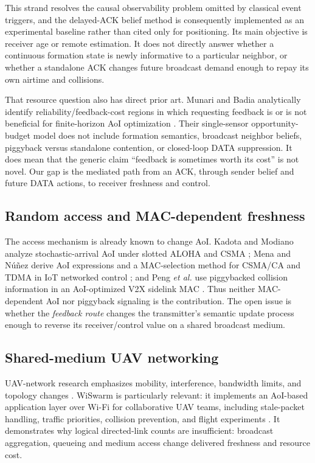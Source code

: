 This strand resolves the causal observability problem omitted by classical
event triggers, and the delayed-ACK belief method is consequently implemented
as an experimental baseline rather than cited only for positioning. Its main
objective is receiver age or remote estimation. It does not directly answer
whether a continuous formation state is newly informative to a particular
neighbor, or whether a standalone ACK changes future broadcast demand enough
to repay its own airtime and collisions.

That resource question also has direct prior art. Munari and Badia
analytically identify reliability/feedback-cost regions in which requesting
feedback is or is not beneficial for finite-horizon AoI optimization
\cite{munari2025feedback}. Their single-sensor opportunity-budget model does
not include formation semantics, broadcast neighbor beliefs, piggyback versus
standalone contention, or closed-loop DATA suppression. It does mean that the
generic claim ``feedback is sometimes worth its cost'' is not novel. Our gap
is the mediated path from an ACK, through sender belief and future DATA
actions, to receiver freshness and control.

\subsection{Random access and MAC-dependent freshness}

The access mechanism is already known to change AoI. Kadota and Modiano analyze
stochastic-arrival AoI under slotted ALOHA and CSMA
\cite{kadota2021randomaccess}; Mena and N\'u\~nez derive AoI expressions and a
MAC-selection method for CSMA/CA and TDMA in IoT networked control
\cite{mena2023macperspective}; and Peng \emph{et al.} use piggybacked collision
information in an AoI-optimized V2X sidelink MAC
\cite{peng2021piggyback}. Thus neither MAC-dependent AoI nor piggyback signaling
is the contribution. The open issue is whether the \emph{feedback route}
changes the transmitter's semantic update process enough to reverse its
receiver/control value on a shared broadcast medium.

\subsection{Shared-medium UAV networking}

UAV-network research emphasizes mobility, interference, bandwidth limits, and
topology changes \cite{gupta2016survey,zeng2016wireless,mozaffari2019tutorial}.
WiSwarm is particularly relevant: it implements an AoI-based application layer
over Wi-Fi for collaborative UAV teams, including stale-packet handling,
traffic priorities, collision prevention, and flight experiments
\cite{tripathi2023wiswarm}. It demonstrates why logical directed-link counts
are insufficient: broadcast aggregation, queueing and medium access change
delivered freshness and resource cost.


